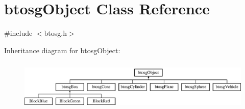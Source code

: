 \hypertarget{classbtosgObject}{}\section{btosg\+Object Class Reference}
\label{classbtosgObject}


{\ttfamily \#include $<$btosg.\+h$>$}

Inheritance diagram for btosg\+Object\+:\begin{figure}[H]
\begin{center}
\leavevmode
\includegraphics[height=2.448980cm]{classbtosgObject}
\end{center}
\end{figure}
